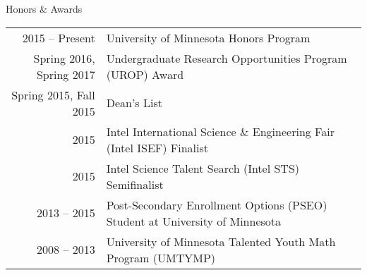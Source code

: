 \begin{rSection}{Honors \& Awards}

  \begin{tabularx}{\linewidth}{r|X}
    2015 -- Present & University of Minnesota Honors Program \\
    Spring 2016, Spring 2017 & Undergraduate Research Opportunities Program (UROP) Award \\
    Spring 2015, Fall 2015 & Dean's List \\
    2015 & Intel International Science \& Engineering Fair (Intel ISEF) Finalist \\
    2015 & Intel Science Talent Search (Intel STS) Semifinalist \\
    2013 -- 2015 & Post-Secondary Enrollment Options (PSEO) Student at University of Minnesota\\
    2008 -- 2013 & University of Minnesota Talented Youth Math Program (UMTYMP)
  \end{tabularx}
\end{rSection}
